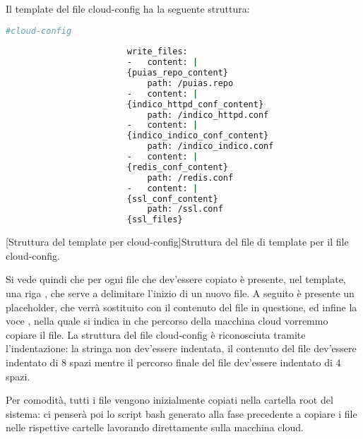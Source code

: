             Il template del file cloud-config ha la seguente struttura:
            
            \begin{center}
                \begin{minipage}{\linewidth}
                    \begin{lstlisting}[language=bash, gobble=22]
                        #cloud-config
                        
                        write_files:
                        -   content: |
                        {puias_repo_content}
                            path: /puias.repo
                        -   content: |
                        {indico_httpd_conf_content}
                            path: /indico_httpd.conf
                        -   content: |
                        {indico_indico_conf_content}
                            path: /indico_indico.conf
                        -   content: |
                        {redis_conf_content}
                            path: /redis.conf
                        -   content: |
                        {ssl_conf_content}
                            path: /ssl.conf
                        {ssl_files}
                    \end{lstlisting}
                    \captionsetup{textformat=empty,labelformat=empty} \vspace{-2em}
                    [Struttura del template per cloud-config]{Struttura del file di template per il file cloud-config.}
                \end{minipage}
            \end{center}
            
            Si vede quindi che per ogni file che dev'essere copiato è presente, nel template, una riga , che serve a delimitare l'inizio di un nuovo file. A seguito è presente un placeholder, che verrà sostituito con il contenuto del file in questione, ed infine la voce , nella quale si indica in che percorso della macchina cloud vorremmo copiare il file. La struttura del file cloud-config è riconosciuta tramite l'indentazione: la stringa  non dev'essere indentata, il contenuto del file dev'essere indentato di 8 spazi mentre il percorso finale del file dev'essere indentato di 4 spazi.
            
            Per comodità, tutti i file vengono inizialmente copiati nella cartella root \bash{/} del sistema: ci penserà poi lo script bash generato alla fase precedente a copiare i file nelle rispettive cartelle lavorando direttamente sulla macchina cloud.
            
